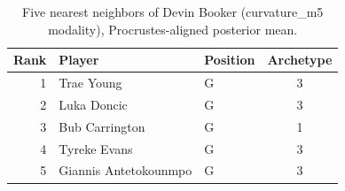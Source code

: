 \begin{table}[htbp]
  \centering\small
  \begin{tabular}{rllc}
    \toprule
    Rank & Player & Position & Archetype \\
    \midrule
    1 & Trae Young & G & 3 \\
    2 & Luka Doncic & G & 3 \\
    3 & Bub Carrington & G & 1 \\
    4 & Tyreke Evans & G & 3 \\
    5 & Giannis Antetokounmpo & G & 3 \\
    \bottomrule
  \end{tabular}
  \caption{Five nearest neighbors of Devin Booker (curvature_m5 modality), Procrustes-aligned posterior mean.}
  \label{tab:Devin_Booker_neighbors_curvature_m5}
\end{table}

